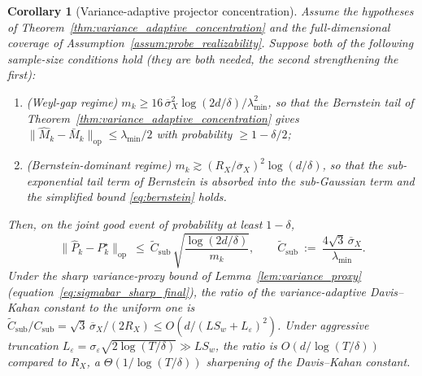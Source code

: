 \documentclass[11pt]{article}
\newcommand{\op}{\mathrm{op}}
\newtheorem{corollary}{Corollary}
\begin{document}
\begin{corollary}[Variance-adaptive projector concentration]
\label{cor:variance_adaptive_davis_kahan}
Assume the hypotheses of
Theorem~\ref{thm:variance_adaptive_concentration} and the
full-dimensional coverage of
Assumption~\ref{assum:probe_realizability}.  Suppose both of the
following sample-size conditions hold (they are both needed, the
second strengthening the first):
\begin{enumerate}[label=\textup{(\roman*)},leftmargin=1.6em,nosep]
\item[\textup{(G)}] (\emph{Weyl-gap regime})
$m_k\ge 16\,\overline{\sigma}_X^2\log(2d/\delta)/\lambda_{\min}^2$,
so that the Bernstein tail of
Theorem~\ref{thm:variance_adaptive_concentration} gives
$\|\widehat M_k-\bar M_k\|_{\op}\le\lambda_{\min}/2$ with probability
$\ge 1-\delta/2$;
\item[\textup{(B)}] (\emph{Bernstein-dominant regime})
$m_k\gtrsim(R_X/\overline{\sigma}_X)^2\log(d/\delta)$, so that the
sub-exponential tail term of Bernstein is absorbed into the sub-Gaussian
term and the simplified bound
\eqref{eq:bernstein} holds.
\end{enumerate}
Then, on the joint good event of probability at least $1-\delta$,
\[
  \bigl\|\widehat P_k-P_k^\star\bigr\|_{\op}
  \ \le\ \widetilde C_{\mathrm{sub}}\,\sqrt{\frac{\log(2d/\delta)}{m_k}},
  \qquad
  \widetilde C_{\mathrm{sub}}
  \ :=\ \frac{4\sqrt{3}\,\overline{\sigma}_X}{\lambda_{\min}}.
\]
Under the sharp variance-proxy bound of Lemma~\ref{lem:variance_proxy}
(equation~\eqref{eq:sigmabar_sharp_final}), the ratio of the
variance-adaptive Davis--Kahan constant to the uniform one is
$\widetilde C_{\mathrm{sub}}/C_{\mathrm{sub}}
=\sqrt 3\,\overline\sigma_X/(2R_X)\le O(d/(LS_w+L_\varepsilon)^2)$.
Under aggressive truncation
$L_\varepsilon=\sigma_\varepsilon\sqrt{2\log(T/\delta)}\gg LS_w$, the ratio is
$O(d/\log(T/\delta))$ compared to $R_X$, a $\Theta(1/\log(T/\delta))$
sharpening of the Davis--Kahan constant.
\end{corollary}
\end{document}
